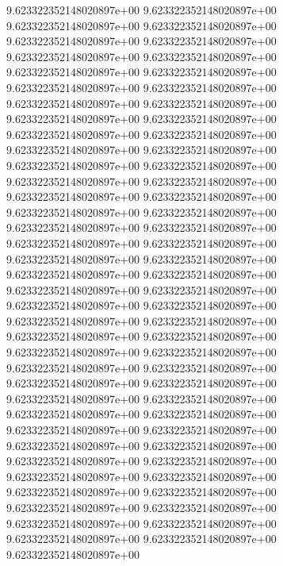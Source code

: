 9.623322352148020897e+00	9.623322352148020897e+00	9.623322352148020897e+00	9.623322352148020897e+00	9.623322352148020897e+00	9.623322352148020897e+00	9.623322352148020897e+00	9.623322352148020897e+00	9.623322352148020897e+00	9.623322352148020897e+00	9.623322352148020897e+00	9.623322352148020897e+00	9.623322352148020897e+00	9.623322352148020897e+00	9.623322352148020897e+00	9.623322352148020897e+00	9.623322352148020897e+00	9.623322352148020897e+00	9.623322352148020897e+00	9.623322352148020897e+00	9.623322352148020897e+00	9.623322352148020897e+00	9.623322352148020897e+00	9.623322352148020897e+00	9.623322352148020897e+00	9.623322352148020897e+00	9.623322352148020897e+00	9.623322352148020897e+00	9.623322352148020897e+00	9.623322352148020897e+00	9.623322352148020897e+00	9.623322352148020897e+00	9.623322352148020897e+00	9.623322352148020897e+00	9.623322352148020897e+00	9.623322352148020897e+00	9.623322352148020897e+00	9.623322352148020897e+00	9.623322352148020897e+00	9.623322352148020897e+00	9.623322352148020897e+00	9.623322352148020897e+00	9.623322352148020897e+00	9.623322352148020897e+00	9.623322352148020897e+00	9.623322352148020897e+00	9.623322352148020897e+00	9.623322352148020897e+00	9.623322352148020897e+00	9.623322352148020897e+00	9.623322352148020897e+00	9.623322352148020897e+00	9.623322352148020897e+00	9.623322352148020897e+00	9.623322352148020897e+00	9.623322352148020897e+00	9.623322352148020897e+00	9.623322352148020897e+00	9.623322352148020897e+00	9.623322352148020897e+00	9.623322352148020897e+00	9.623322352148020897e+00	9.623322352148020897e+00	9.623322352148020897e+00	9.623322352148020897e+00	9.623322352148020897e+00	9.623322352148020897e+00	9.623322352148020897e+00	9.623322352148020897e+00	9.623322352148020897e+00	9.623322352148020897e+00
